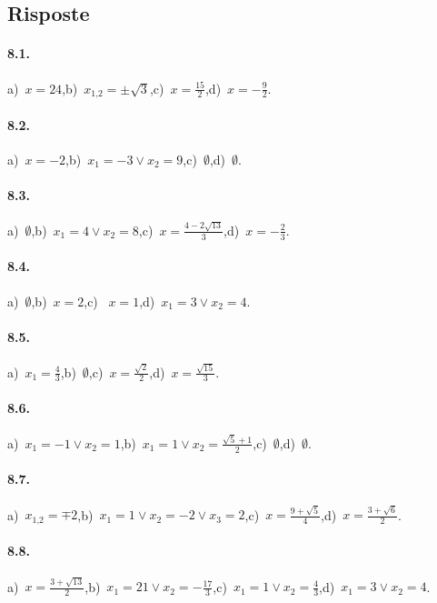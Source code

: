 \subsection{Risposte}
\begin{multicols}{2}
\paragraph{8.1.} a)~$x=24$,\quad b)~$x_{1\text{,}2}=\pm \sqrt 3$,\quad c)~$x=\frac{15} 2$,\quad d)~$x=-\frac 9 2$.

\paragraph{8.2.} a)~$x=-2$,\quad b)~$x_1=-3\vee x_2=9$,\quad c)~$\emptyset $,\quad d)~$\emptyset$.

\paragraph{8.3.} a)~$\emptyset$,\quad b)~$x_1=4\vee x_2=8$,\quad c)~$x=\frac{4-2\sqrt{13}} 3$,\quad d)~$x=-\frac 2 3$.

\paragraph{8.4.} a)~$\emptyset$,\quad b)~$x=2$,\quad c)~ $x=1$,\quad d)~$x_1=3\vee x_2=4$.

\paragraph{8.5.} a)~$x_1=\frac 4 3$,\quad b)~$\emptyset$,\quad c)~$x=\frac{\sqrt 2} 2$,\quad d)~$x=\frac{\sqrt{15}} 3$.

\paragraph{8.6.} a)~$x_1=-1\vee x_2=1$,\quad b)~$x_1=1\vee x_2=\frac{\sqrt 5+1} 2$,\quad c)~$\emptyset$,\quad d)~$\emptyset$.

\paragraph{8.7.} a)~$x_{1\text{,}2}=\mp 2$,\quad b)~$x_1=1\vee x_2=-2\vee x_3=2$,\quad c)~$x=\frac{9+\sqrt 5} 4$,\quad d)~$x=\frac{3+\sqrt 6} 2$.

\paragraph{8.8.} a)~$x=\frac{3+\sqrt{13}} 2$,\quad b)~$x_1=21\vee x_2=-\frac{17} 3$,\quad c)~$x_1=1\vee x_2=\frac 4 3$,\quad d)~$x_1=3\vee x_2=4$.


\end{multicols}
